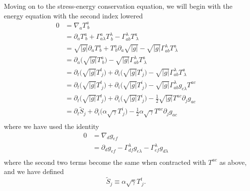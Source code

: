 \documentclass[12pt]{article}
\numberwithin{equation}{section}
\begin{document}
Moving on to the stress-energy conservation equation, we will begin with the energy equation with the second index lowered
\begin{equation}
\begin{aligned}
0 &= \nabla_{a} T^{a}_{~b} \\
&= \partial_a T^{a}_{~b} + \Gamma^{a}_{a \lambda} T^{\lambda}_{~b} - \Gamma^{\lambda}_{ab} T^{a}_{~\lambda} \\
&= \sqrt{|g|} \partial_a T^{a}_{~b} + T^{a}_{~b} \partial_{a} \sqrt{|g|} - \sqrt{|g|} \Gamma^{\lambda}_{ab} T^{a}_{~\lambda} \\
&= \partial_a \Big( \sqrt{|g|} T^{a}_{~b} \Big) - \sqrt{|g|} \Gamma^{\lambda}_{ab} T^{a}_{~\lambda} \\
&= \partial_t \Big( \sqrt{|g|} T^{t}_{~j} \Big) + \partial_i \Big( \sqrt{|g|} T^{i}_{~j} \Big) - \sqrt{|g|} \Gamma^{\lambda}_{ab} T^{a}_{~\lambda} \\
&= \partial_t \Big( \sqrt{|g|} T^{t}_{~j} \Big) + \partial_i \Big( \sqrt{|g|} T^{i}_{~j} \Big) - \sqrt{|g|} \Gamma^{\lambda}_{ab} g_{c \lambda} T^{a c} \\
&= \partial_t \Big( \sqrt{|g|} T^{t}_{~j} \Big) + \partial_i \Big( \sqrt{|g|} T^{i}_{~j} \Big) - \frac{1}{2} \sqrt{|g|} T^{ac} \partial_{j} g_{ac} \\
&= \partial_t \tilde{S}_j + \partial_i \Big( \alpha \sqrt{\gamma} T^{i}_{~j} \Big) - \frac{1}{2} \alpha \sqrt{\gamma} T^{ac} \partial_{j} g_{ac} \\
\end{aligned}
\end{equation}
where we have used the identity
\begin{equation}
\begin{aligned}
0 &= \nabla_{d} g_{ef} \\
&= \partial_{d} g_{ef} - \Gamma^{\lambda}_{df} g_{e \lambda} - \Gamma^{\lambda}_{ef} g_{d \lambda} \\
\end{aligned}
\end{equation}
where the second two terms become the same when contracted with $T^{ac}$ as above, and we have defined
\begin{equation}
\tilde{S}_j \equiv \alpha \sqrt{\gamma} T^{t}_{~j}.
\end{equation}
\end{document}
